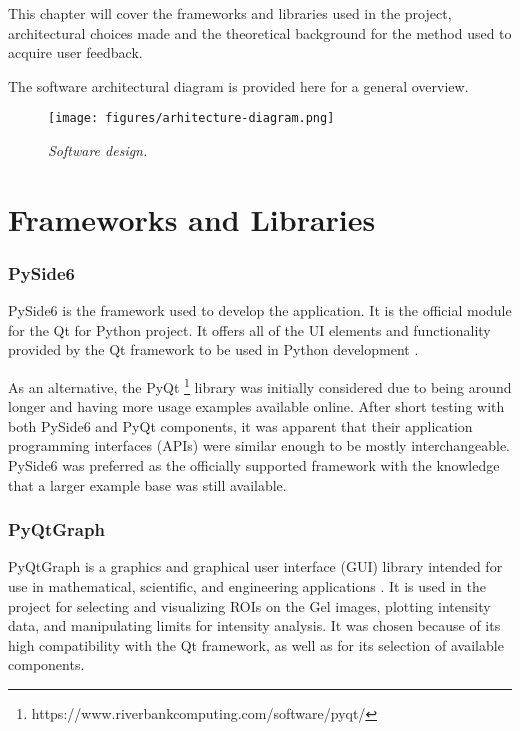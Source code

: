 This chapter will cover the frameworks and libraries used in the project, architectural choices made and the theoretical background for the method used to acquire user feedback.

The software architectural diagram is provided here for a general overview.

\begin{figure}[ht]
    \centering
    \texttt{[image: figures/arhitecture-diagram.png]}
    \caption{\textit{Software design.}}
    \label{fig:app-arh-diag}
\end{figure}

\section{Frameworks and Libraries}

\subsubsection{PySide6}
PySide6 is the framework used to develop the application. It is the official module for the Qt for Python project. It offers all of the UI elements and functionality provided by the Qt framework to be used in Python development \cite{pyside6}.

As an alternative, the PyQt \footnote{https://www.riverbankcomputing.com/software/pyqt/} library was initially considered due to being around longer and having more usage examples available online. After short testing with both PySide6 and PyQt components, it was apparent that their application programming interfaces (APIs) were similar enough to be mostly interchangeable. PySide6 was preferred as the officially supported framework with the knowledge that a larger example base was still available.

\subsubsection{PyQtGraph}
PyQtGraph is a graphics and graphical user interface (GUI) library intended for use in mathematical, scientific, and engineering applications \cite{pyqtgraph}. It is used in the project for selecting and visualizing ROIs on the Gel images, plotting intensity data, and manipulating limits for intensity analysis. It was chosen because of its high compatibility with the Qt framework, as well as for its selection of available components.

